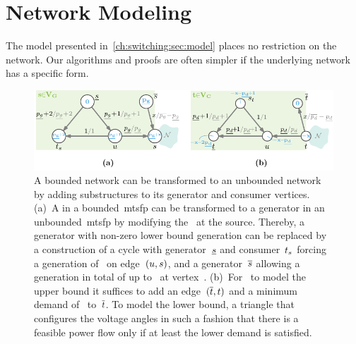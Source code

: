 \section{Network Modeling}\label{ch:switching:sec:network_modeling}
%
The model presented in~\cref{ch:switching:sec:model} places no restriction on
the network. Our algorithms and proofs are often simpler if the underlying
network has a specific form.
% 
\begin{figure}[t!]%
% 
\centering
\includegraphics{switchplacement/figures/bounded_unbounded_mtsf_transformation.pdf}%
%
\caption[The transformation of an unbounded into a bounded network.]{
  A bounded network can be transformed to an unbounded network by
  adding substructures to its generator and consumer vertices. (a)~A
   in a
  bounded~\gls{mtsfp} can be transformed to a generator in an
  unbounded~\gls{mtsfp} by modifying
  the~ at the source.
  Thereby, a generator with non-zero lower bound generation can be replaced by a
  construction of a cycle with generator~$\underline{s}$ and
  consumer~$t_{s}$ forcing a generation
  of~ on edge~$(u,s)$, and a
  generator~$\overline{s}$ allowing a generation in total of up
  to~ at vertex~\source.
  (b)~For~ to model the upper bound it
  suffices to add an edge~$(\overline{t},t)$ and a minimum demand
  of~ to~$\overline{t}$. To model the lower
  bound, a triangle that configures the voltage angles in such a fashion that
  there is a feasible power flow only if at least the lower demand is satisfied.
  }
\label{ch:switching:sec:network_modeling:fig:bounded_unbounded_mtsf_transformation}%
\end{figure}%

